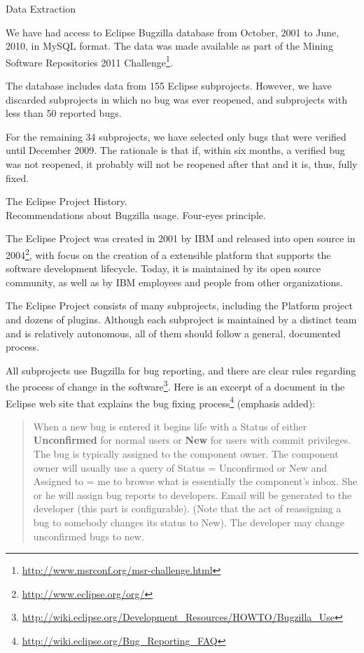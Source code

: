 \begin{section}{Data Extraction}

	We have had access to Eclipse Bugzilla database from October, 2001 to June, 2010, in MySQL format. The data was made available as part of the Mining Software Repositories 2011 Challenge\footnote{\url{http://www.msrconf.org/msr-challenge.html}}.

	The database includes data from 155 Eclipse subprojects. However, we have discarded subprojects in which no bug was ever reopened, and subprojects with less than 50 reported bugs.

	For the remaining 34 subprojects, we have selected only bugs that were verified until December 2009. The rationale is that if, within six months, a verified bug was not reopened, it probably will not be reopened after that and it is, thus, fully fixed.

\begin{subsection}{The Eclipse Project}
	History. \\
	Recommendations about Bugzilla usage. Four-eyes principle.

	The Eclipse Project was created in 2001 by IBM and released into open source in 2004\footnote{\url{http://www.eclipse.org/org/}}, with focus on the creation of a extensible platform that supports the software development lifecycle. Today, it is maintained by its open source community, as well as by IBM employees and people from other organizations.

	The Eclipse Project consists of many subprojects, including the Platform project and dozens of plugins. Although each subproject is maintained by a distinct team and is relatively autonomous, all of them should follow a general, documented process. 

	All subprojects use Bugzilla for bug reporting, and there are clear rules regarding the process of change in the software\footnote{\url{http://wiki.eclipse.org/Development_Resources/HOWTO/Bugzilla_Use}}. Here is an excerpt of a document in the Eclipse web site that explains the bug fixing process\footnote{\url{http://wiki.eclipse.org/Bug_Reporting_FAQ}} (emphasis added):

	\begin{quote}
	When a new bug is entered it begins life with a Status of either \textbf{Unconfirmed} for normal users or \textbf{New} for users with commit privileges. The bug is typically assigned to the component owner. The component owner will usually use a query of Status = Unconfirmed or New and Assigned to = me to browse what is essentially the component's inbox. She or he will assign bug reports to developers. Email will be generated to the developer (this part is configurable). (Note that the act of reassigning a bug to somebody changes its status to New). The developer may change unconfirmed bugs to new.


\end{quote}
\end{subsection}
\end{section}

